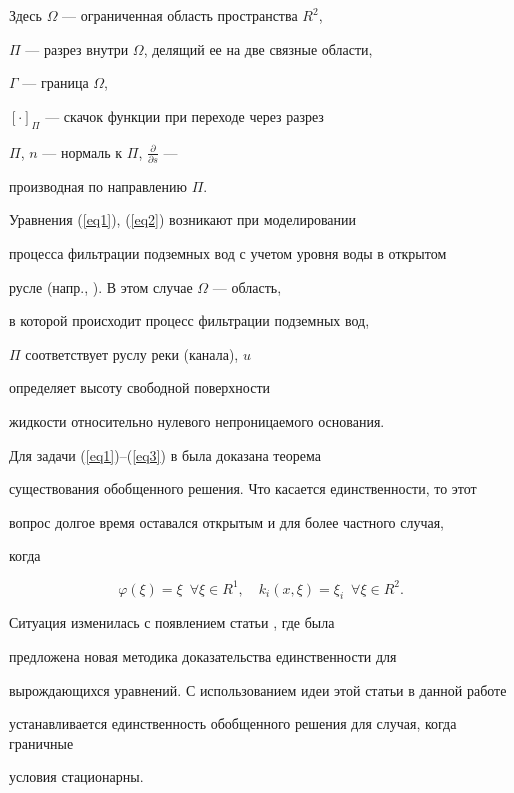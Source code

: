 Здесь $\Omega$ --- ограниченная область пространства $R^{2}$,


$\Pi$ --- разрез внутри $\Omega$, делящий ее на две связные области,


$\Gamma$ --- граница $ \Omega$,


$[ \cdot ]_{\Pi}$ --- скачок функции при переходе через разрез


$\Pi$, $n$ --- нормаль к $\Pi$, $\frac{\partial}{\partial s}$ ---


производная по направлению $\Pi$.





Уравнения (\ref{eq1}), (\ref{eq2}) возникают при моделировании 


процесса фильтрации подземных вод с учетом уровня воды в открытом 


русле (напр., \cite{1}). В этом случае $\Omega $ --- область, 


в которой происходит процесс фильтрации подземных вод,


$\Pi$ соответствует руслу реки (канала), $u$


определяет высоту свободной поверхности


жидкости относительно нулевого непроницаемого основания.





Для задачи (\ref{eq1})--(\ref{eq3}) в \cite{2} была доказана теорема


существования обобщенного решения. Что касается единственности, то этот 


вопрос долгое время оставался открытым и для более частного случая, 


когда \cite{1}


$$ 


\varphi (\xi)=\xi\ \; \forall \xi \in R^{1}, \quad


k_{i}(x, \xi)=\xi_{i}\ \; \forall \xi \in R^{2}.


$$


Ситуация изменилась с появлением статьи \cite{3}, где была 


предложена новая методика доказательства единственности для 


вырождающихся уравнений. С использованием идеи этой статьи в данной работе 


устанавливается единственность обобщенного решения для случая, когда граничные 


условия стационарны.





